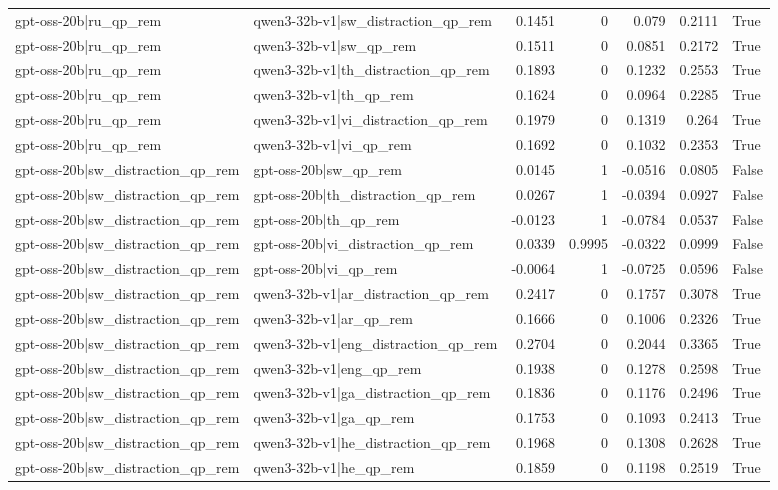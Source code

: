 \begin{table}
\begin{tabular}{l l r r r r l}
gpt-oss-20b|ru_qp_rem & qwen3-32b-v1|sw_distraction_qp_rem & 0.1451 & 0 & 0.079 & 0.2111 & True \\
gpt-oss-20b|ru_qp_rem & qwen3-32b-v1|sw_qp_rem & 0.1511 & 0 & 0.0851 & 0.2172 & True \\
gpt-oss-20b|ru_qp_rem & qwen3-32b-v1|th_distraction_qp_rem & 0.1893 & 0 & 0.1232 & 0.2553 & True \\
gpt-oss-20b|ru_qp_rem & qwen3-32b-v1|th_qp_rem & 0.1624 & 0 & 0.0964 & 0.2285 & True \\
gpt-oss-20b|ru_qp_rem & qwen3-32b-v1|vi_distraction_qp_rem & 0.1979 & 0 & 0.1319 & 0.264 & True \\
gpt-oss-20b|ru_qp_rem & qwen3-32b-v1|vi_qp_rem & 0.1692 & 0 & 0.1032 & 0.2353 & True \\
gpt-oss-20b|sw_distraction_qp_rem & gpt-oss-20b|sw_qp_rem & 0.0145 & 1 & -0.0516 & 0.0805 & False \\
gpt-oss-20b|sw_distraction_qp_rem & gpt-oss-20b|th_distraction_qp_rem & 0.0267 & 1 & -0.0394 & 0.0927 & False \\
gpt-oss-20b|sw_distraction_qp_rem & gpt-oss-20b|th_qp_rem & -0.0123 & 1 & -0.0784 & 0.0537 & False \\
gpt-oss-20b|sw_distraction_qp_rem & gpt-oss-20b|vi_distraction_qp_rem & 0.0339 & 0.9995 & -0.0322 & 0.0999 & False \\
gpt-oss-20b|sw_distraction_qp_rem & gpt-oss-20b|vi_qp_rem & -0.0064 & 1 & -0.0725 & 0.0596 & False \\
gpt-oss-20b|sw_distraction_qp_rem & qwen3-32b-v1|ar_distraction_qp_rem & 0.2417 & 0 & 0.1757 & 0.3078 & True \\
gpt-oss-20b|sw_distraction_qp_rem & qwen3-32b-v1|ar_qp_rem & 0.1666 & 0 & 0.1006 & 0.2326 & True \\
gpt-oss-20b|sw_distraction_qp_rem & qwen3-32b-v1|eng_distraction_qp_rem & 0.2704 & 0 & 0.2044 & 0.3365 & True \\
gpt-oss-20b|sw_distraction_qp_rem & qwen3-32b-v1|eng_qp_rem & 0.1938 & 0 & 0.1278 & 0.2598 & True \\
gpt-oss-20b|sw_distraction_qp_rem & qwen3-32b-v1|ga_distraction_qp_rem & 0.1836 & 0 & 0.1176 & 0.2496 & True \\
gpt-oss-20b|sw_distraction_qp_rem & qwen3-32b-v1|ga_qp_rem & 0.1753 & 0 & 0.1093 & 0.2413 & True \\
gpt-oss-20b|sw_distraction_qp_rem & qwen3-32b-v1|he_distraction_qp_rem & 0.1968 & 0 & 0.1308 & 0.2628 & True \\
gpt-oss-20b|sw_distraction_qp_rem & qwen3-32b-v1|he_qp_rem & 0.1859 & 0 & 0.1198 & 0.2519 & True \\

\end{tabular}
\end{table}
